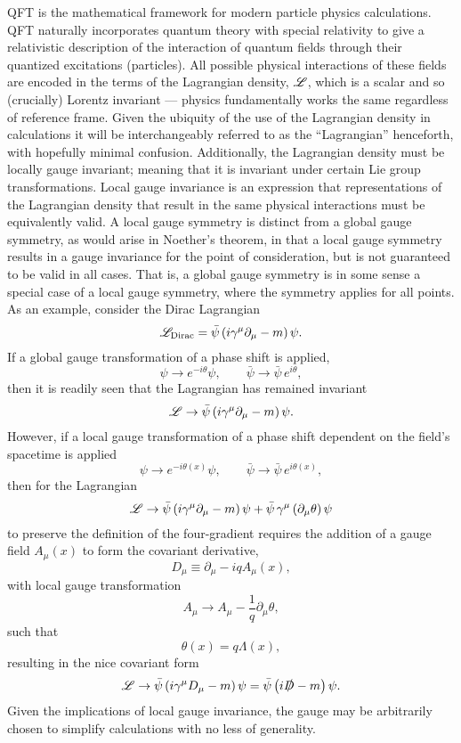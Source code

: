 \acrlong{QFT} is the mathematical framework for modern particle physics calculations.
QFT naturally incorporates quantum theory with special relativity to give a relativistic description of the interaction of quantum fields through their quantized excitations (particles).
All possible physical interactions of these fields are encoded in the terms of the Lagrangian density, $\mathscr{L}$, which is a scalar and so (crucially) Lorentz invariant --- physics fundamentally works the same regardless of reference frame.
Given the ubiquity of the use of the Lagrangian density in calculations it will be interchangeably referred to as the ``Lagrangian'' henceforth, with hopefully minimal confusion.
Additionally, the Lagrangian density must be locally gauge invariant; meaning that it is invariant under certain Lie group transformations.
Local gauge invariance is an expression that representations of the Lagrangian density that result in the same physical interactions must be equivalently valid.
A local gauge symmetry is distinct from a global gauge symmetry, as would arise in Noether's theorem, in that a local gauge symmetry results in a gauge invariance for the point of consideration, but is not guaranteed to be valid in all cases.
That is, a global gauge symmetry is in some sense a special case of a local gauge symmetry, where the symmetry applies for all points.
As an example, consider the Dirac Lagrangian
\begin{equation}
 \mathscr{L}_{\textrm{Dirac}} = \bar{\psi} \left(i \gamma^{\mu}\partial_{\mu} - m\right)\psi.
 \label{eq:Dirac_Lagrangian}
\end{equation}
If a global gauge transformation of a phase shift is applied,
\[
 \psi \to e^{-i\theta} \psi, \qquad \bar{\psi} \to \bar{\psi}\,e^{i\theta},
\]
then it is readily seen that the Lagrangian has remained invariant
\[
 \mathscr{L} \to \bar{\psi} \left(i \gamma^{\mu}\partial_{\mu} - m\right)\psi.
\]
However, if a local gauge transformation of a phase shift dependent on the field's spacetime is applied
\[
 \psi \to e^{-i\theta(x)} \psi, \qquad \bar{\psi} \to \bar{\psi}\,e^{i\theta(x)},
\]
then for the Lagrangian
\[
 \mathscr{L} \to \bar{\psi} \left(i \gamma^{\mu}\partial_{\mu} - m\right)\psi + \bar{\psi}\, \gamma^{\mu} \left(\partial_{\mu} \theta\right)\psi
\]
to preserve the definition of the four-gradient requires the addition of a gauge field $A_{\mu}(x)$ to form the covariant derivative,
\[
 D_{\mu} \equiv \partial_{\mu} - iq A_{\mu}(x),
\]
with local gauge transformation
\[
 A_{\mu} \to A_{\mu} - \frac{1}{q} \partial_{\mu}\theta,
\]
such that
\[
 \theta(x) = q \Lambda(x),
\]
resulting in the nice covariant form
\[
 \mathscr{L} \to \bar{\psi} \left(i \gamma^{\mu}D_{\mu} - m\right)\psi = \bar{\psi} \left(i \slashed{D} - m\right)\psi.
\]
Given the implications of local gauge invariance, the gauge may be arbitrarily chosen to simplify calculations with no less of generality.

